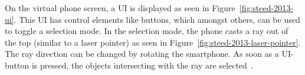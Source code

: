On the virtual phone screen, a \gls{UI} is displayed as seen in Figure~\ref{fig:steed-2013-ui}. This \gls{UI} has control elements like buttons, which amongst others, can be used to toggle a selection mode. In the selection mode, the phone casts a ray out of the top (similar to a laser pointer) as seen in Figure~\ref{fig:steed-2013-laser-pointer}. The ray direction can be changed by rotating the smartphone. As soon as a \gls{UI}-button is pressed, the objects intersecting with the ray are selected~\cite{Steed.2013}.
